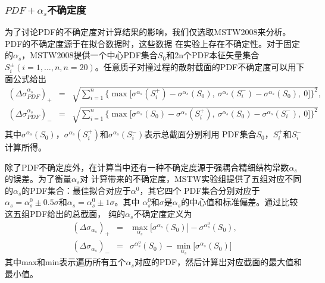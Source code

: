 \subsubsection{$PDF+\alpha_s$不确定度}
为了讨论PDF的不确定度对计算结果的影响，我们仅选取MSTW2008来分析。PDF的不确定度源于在拟合数据时，这些数据
在实验上存在不确定性。对于固定的$\alpha_s$，MSTW2008提供一个中心PDF集合$S_0$和2n个PDF本征矢量集合
$S^{\pm}_i(i = 1,\ldots,n, n=20)$。任意质子对撞过程的散射截面的PDF不确定度可以用下面公式给出
\cite{mstw2008:method}
\begin{eqnarray}
\left( \Delta \sigma^{\alpha_s}_{PDF} \right)_{+}
&=&
\sqrt{
\sum_{i=1}^{n}
\biggl\{
\max
\Big[
\sigma^{\alpha_s}(S^+_i) - \sigma^{\alpha_s}(S_0),~
\sigma^{\alpha_s}(S^-_i) - \sigma^{\alpha_s}(S_0),~
0
\Big]
\biggr\}^2
}, \nonumber \\
\left( \Delta \sigma^{\alpha_s}_{PDF} \right)_{-}
&=&
\sqrt{
\sum_{i=1}^{n}
\biggl\{
\max
\Big[
\sigma^{\alpha_s}(S_0) - \sigma^{\alpha_s}(S^+_i),~
\sigma^{\alpha_s}(S_0) - \sigma^{\alpha_s}(S^-_i),~
0
\Big]
\biggr\}^2
}
\nonumber \\
\label{eq:pdferror-mstw}
\end{eqnarray}
其中$\sigma^{\alpha_s}(S_0)$，$\sigma^{\alpha_s}(S_i^{+})$和$\sigma^{\alpha_s}(S_i^{-})$表示总截面分别利用
PDF集合$S_0$，$S^+_i$和$S^-_i$计算所得。

除了PDF不确定度外，在计算当中还有一种不确定度源于强耦合精细结构常数$\alpha_s$的误差。为了衡量$\alpha_s$对
计算带来的不确定度，MSTW实验组提供了五组对应不同的$\alpha_s$的PDF集合：最佳拟合对应于$\alpha^0$，其它四个
PDF集合分别对应于$\alpha_s = \alpha_s^0 \pm 0.5 \sigma$和$\alpha_s = \alpha_s^0 \pm 1 \sigma$。其中
$\alpha^0_s$和$\sigma$是$\alpha_s$的中心值和标准偏差。通过比较这五组PDF给出的总截面，
纯的$\alpha_s$不确定度定义为
\begin{eqnarray}
\label{eq:aserror-mstw}
\left( \Delta \sigma_{\alpha_s} \right)_{+}
&=&
\max_{\alpha_s}
\Big[
\sigma^{\alpha_s}(S_0)
\Big]
- \sigma^{\alpha_s^0}(S_0), \nonumber \\
\left( \Delta \sigma_{\alpha_s} \right)_{-}
&=&
\sigma^{\alpha_s^0}(S_0) -
\min_{\alpha_s}
\Big[
\sigma^{\alpha_s}(S_0)
\Big]
\end{eqnarray}
其中max和min表示遍历所有五个$\alpha_s$对应的PDF，然后计算出对应截面的最大值和最小值。

